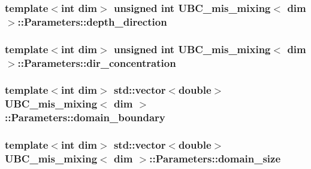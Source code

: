 \subsubsection[{depth\+\_\+direction}]{\setlength{\rightskip}{0pt plus 5cm}template$<$int dim$>$ unsigned int {\bf U\+B\+C\+\_\+mis\+\_\+mixing}$<$ dim $>$\+::Parameters\+::depth\+\_\+direction}\label{struct_u_b_c__mis__mixing_1_1_parameters_abaad9269bbf285086d40e5d8c3a6bbdd}
\hypertarget{struct_u_b_c__mis__mixing_1_1_parameters_ab32e4f6b79a7978b4439fa6407b44ea1}{}
\subsubsection[{dir\+\_\+concentration}]{\setlength{\rightskip}{0pt plus 5cm}template$<$int dim$>$ unsigned int {\bf U\+B\+C\+\_\+mis\+\_\+mixing}$<$ dim $>$\+::Parameters\+::dir\+\_\+concentration}\label{struct_u_b_c__mis__mixing_1_1_parameters_ab32e4f6b79a7978b4439fa6407b44ea1}
\hypertarget{struct_u_b_c__mis__mixing_1_1_parameters_ab5dd18f3f93bdac91f6d9ac765f7b0f2}{}
\subsubsection[{domain\+\_\+boundary}]{\setlength{\rightskip}{0pt plus 5cm}template$<$int dim$>$ std\+::vector$<$double$>$ {\bf U\+B\+C\+\_\+mis\+\_\+mixing}$<$ dim $>$\+::Parameters\+::domain\+\_\+boundary}\label{struct_u_b_c__mis__mixing_1_1_parameters_ab5dd18f3f93bdac91f6d9ac765f7b0f2}
\hypertarget{struct_u_b_c__mis__mixing_1_1_parameters_afb1287d7ff99313c1810618d9ba3e88d}{}
\subsubsection[{domain\+\_\+size}]{\setlength{\rightskip}{0pt plus 5cm}template$<$int dim$>$ std\+::vector$<$double$>$ {\bf U\+B\+C\+\_\+mis\+\_\+mixing}$<$ dim $>$\+::Parameters\+::domain\+\_\+size}\label{struct_u_b_c__mis__mixing_1_1_parameters_afb1287d7ff99313c1810618d9ba3e88d}
\hypertarget{struct_u_b_c__mis__mixing_1_1_parameters_a398a5206459752d26d9851834bb8ef43}{}
